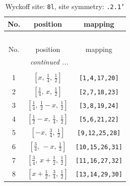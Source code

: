 \documentclass[fleqn,8pt]{jsarticle}
\begin{document}
\begin{longtable}{ccc}
\caption{Wyckoff site: {\tt 8l}, site symmetry: {\tt .2.1'}}
 \\
 \hline \hline
No. & position & mapping \\ \hline \endfirsthead

\multicolumn{2}{l}{\tablename\ \thetable{}} \\
 \hline \hline
No. & position & mapping \\ \hline \endhead

 \hline \hline
\multicolumn{2}{r}{\footnotesize\it continued ...} \\ \endfoot

 \hline \hline
\multicolumn{2}{r}{} \\ \endlastfoot

1 & $\left[ x,\, \frac{1}{4},\, \frac{1}{2} \right]$ & {\tt [1,4,17,20]} \\ \hline
2 & $\left[ \frac{1}{4},\, x,\, \frac{1}{2} \right]$ & {\tt [2,7,18,23]} \\ \hline
3 & $\left[ \frac{1}{4},\, \frac{1}{2} - x,\, \frac{1}{2} \right]$ & {\tt [3,8,19,24]} \\ \hline
4 & $\left[ \frac{1}{2} - x,\, \frac{1}{4},\, \frac{1}{2} \right]$ & {\tt [5,6,21,22]} \\ \hline
5 & $\left[ - x,\, \frac{3}{4},\, \frac{1}{2} \right]$ & {\tt [9,12,25,28]} \\ \hline
6 & $\left[ \frac{3}{4},\, - x,\, \frac{1}{2} \right]$ & {\tt [10,15,26,31]} \\ \hline
7 & $\left[ \frac{3}{4},\, x + \frac{1}{2},\, \frac{1}{2} \right]$ & {\tt [11,16,27,32]} \\ \hline
8 & $\left[ x + \frac{1}{2},\, \frac{3}{4},\, \frac{1}{2} \right]$ & {\tt [13,14,29,30]} \\
\end{longtable}
\renewcommand{\arraystretch}{1.2}
\end{document}
